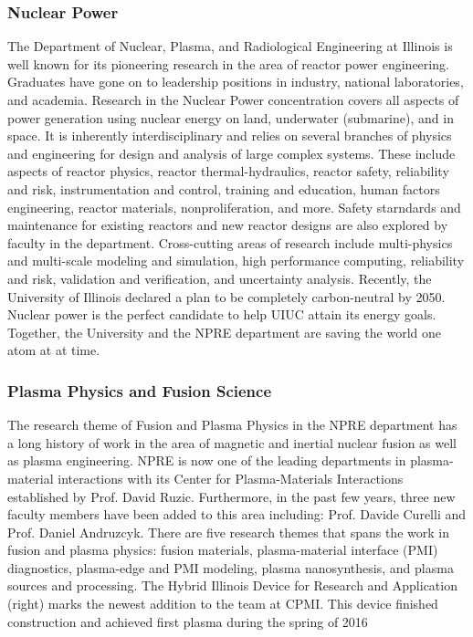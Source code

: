 \documentclass[12pt, letterpaper]{article}
\begin{document}
\subsubsection{Nuclear Power}
The Department of Nuclear, Plasma, and Radiological Engineering at Illinois is well known for its pioneering research in the area of reactor power engineering. Graduates have gone on to leadership positions in industry, national laboratories, and academia. Research in the Nuclear Power concentration covers all aspects of power generation using nuclear energy on land, underwater (submarine), and in space. It is inherently interdisciplinary and relies on several branches of physics and engineering for design and analysis of large complex systems. These include aspects of reactor physics, reactor thermal-hydraulics, reactor safety, reliability and risk, instrumentation and control, training and education, human factors engineering, reactor materials, nonproliferation, and more. Safety starndards and maintenance for existing reactors and new reactor designs are also explored by faculty in the department. Cross-cutting areas of research include multi-physics and multi-scale modeling and simulation, high performance computing, reliability and risk, validation and verification, and uncertainty analysis. Recently, the University of Illinois declared a plan to be completely carbon-neutral by 2050. Nuclear power is the perfect candidate to help UIUC attain its energy goals. Together, the University and the NPRE department are saving the world one atom at at time.

\subsubsection{Plasma Physics and Fusion Science}
The research theme of Fusion and Plasma Physics in the NPRE department has a long history of work in the area of magnetic and inertial nuclear fusion as well as plasma engineering. NPRE is now one of the leading departments in plasma-material interactions with its Center for Plasma-Materials Interactions established by Prof. David Ruzic. Furthermore, in the past few years, three new faculty members have been added to this area including: Prof. Davide Curelli and Prof. Daniel Andruzcyk. There are five research themes that spans the work in fusion and plasma physics: fusion materials, plasma-material interface (PMI) diagnostics, plasma-edge and PMI modeling, plasma nanosynthesis, and plasma sources and processing. The Hybrid Illinois Device for Research and Application (right) marks the newest addition to the team at CPMI. This device finished construction and achieved first plasma during the spring of 2016
\end{document}
